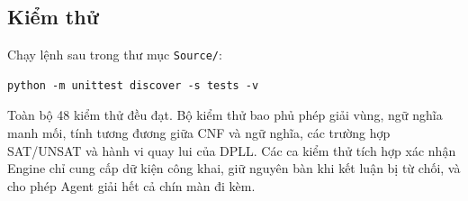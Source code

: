 \subsection{Kiểm thử}
Chạy lệnh sau trong thư mục \texttt{Source/}:
\begin{lstlisting}
python -m unittest discover -s tests -v
\end{lstlisting}
Toàn bộ 48 kiểm thử đều đạt. Bộ kiểm thử bao phủ phép giải vùng,
ngữ nghĩa manh mối, tính tương đương giữa CNF và ngữ nghĩa, các trường
hợp SAT/UNSAT và hành vi quay lui của DPLL. Các ca kiểm thử tích hợp
xác nhận Engine chỉ cung cấp dữ kiện công khai, giữ nguyên bàn khi
kết luận bị từ chối, và cho phép Agent giải hết cả chín màn đi kèm.
